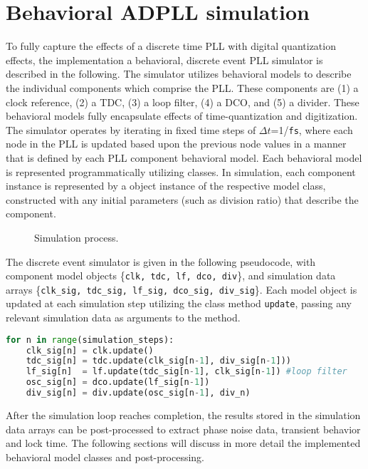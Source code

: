 \section{Behavioral ADPLL simulation}
To fully capture the effects of a discrete time PLL with digital quantization effects, the implementation a behavioral, discrete event PLL simulator is described in the following. The simulator utilizes behavioral models to describe the individual components which comprise the PLL. These components are (1) a clock reference, (2) a TDC, (3) a loop filter, (4) a DCO, and (5) a divider. These behavioral models fully encapsulate effects of time-quantization and digitization. The simulator operates by iterating in fixed time steps of $\Delta t$=1/\texttt{fs}, where each node in the PLL is updated based upon the previous node values in a manner that is defined by each PLL component behavioral model. Each behavioral model is represented programmatically utilizing classes. In simulation, each component instance is represented by a object instance of the respective model class, constructed with any initial parameters (such as division ratio) that describe the component.
\begin{figure}[htb!]
	\center
	\caption{Simulation process.}
	\label{fig:simulator}
\end{figure}
\FloatBarrier
The discrete event simulator is given in the following pseudocode, with component model objects \{\texttt{clk, tdc, lf, dco, div}\}, and simulation data arrays \{\texttt{clk\_sig, tdc\_sig, lf\_sig, dco\_sig, div\_sig}\}. Each model object is updated at each simulation step utilizing the class method \texttt{update}, passing any relevant simulation data as arguments to the method.

\begin{lstlisting}[language={Python}, caption={PLL simulation loop Python pseudocode}, label={sim_code}]
for n in range(simulation_steps):
    clk_sig[n] = clk.update()
    tdc_sig[n] = tdc.update(clk_sig[n-1], div_sig[n-1]))
    lf_sig[n]  = lf.update(tdc_sig[n-1], clk_sig[n-1]) #loop filter
    osc_sig[n] = dco.update(lf_sig[n-1])
    div_sig[n] = div.update(osc_sig[n-1], div_n)
    \end{lstlisting}
After the simulation loop reaches completion, the results stored in the simulation data arrays can be post-processed to extract phase noise data, transient behavior and lock time. The following sections will discuss in more detail the implemented behavioral model classes and post-processing.

